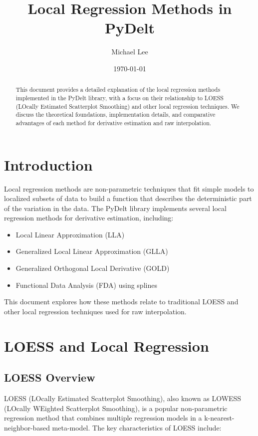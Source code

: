 \documentclass{article}
\title{Local Regression Methods in PyDelt}
\author{Michael Lee}
\date{\today}
\begin{document}
\maketitle

\begin{abstract}
This document provides a detailed explanation of the local regression methods implemented in the PyDelt library, with a focus on their relationship to LOESS (LOcally Estimated Scatterplot Smoothing) and other local regression techniques. We discuss the theoretical foundations, implementation details, and comparative advantages of each method for derivative estimation and raw interpolation.
\end{abstract}

\section{Introduction}

Local regression methods are non-parametric techniques that fit simple models to localized subsets of data to build a function that describes the deterministic part of the variation in the data. The PyDelt library implements several local regression methods for derivative estimation, including:

\begin{itemize}
    \item Local Linear Approximation (LLA)
    \item Generalized Local Linear Approximation (GLLA)
    \item Generalized Orthogonal Local Derivative (GOLD)
    \item Functional Data Analysis (FDA) using splines
\end{itemize}

This document explores how these methods relate to traditional LOESS and other local regression techniques used for raw interpolation.

\section{LOESS and Local Regression}

\subsection{LOESS Overview}

LOESS (LOcally Estimated Scatterplot Smoothing), also known as LOWESS (LOcally WEighted Scatterplot Smoothing), is a popular non-parametric regression method that combines multiple regression models in a k-nearest-neighbor-based meta-model. The key characteristics of LOESS include:
\end{document}
